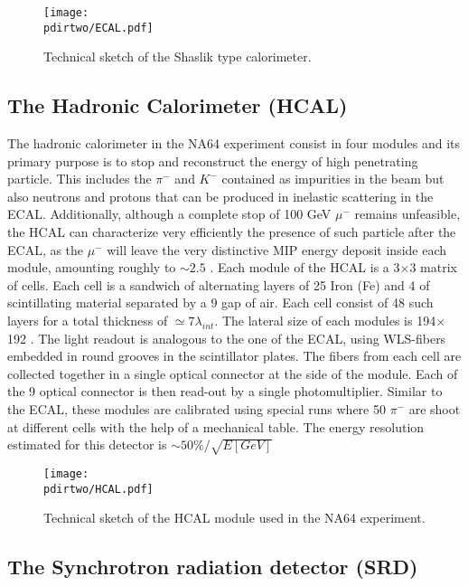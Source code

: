 \begin{figure}[bth!]
  \centering
  \texttt{[image: \\pdirtwo/ECAL.pdf]}
  \caption[ECAL sketch]{Technical sketch of the Shaslik type calorimeter.}
  \label{fig:ecal-sketch}
\end{figure}

\subsection{The Hadronic Calorimeter (HCAL)}
\label{ch2:sec:detectors-hcal}

The hadronic calorimeter in the NA64 experiment consist in four modules and its primary purpose is to stop and reconstruct the energy of high penetrating particle. This includes the $\pi^-$ and $K^-$ contained as impurities in the beam but also neutrons and protons that can be produced in inelastic scattering in the ECAL. Additionally, although a complete stop of 100 GeV $\mu^-$ remains unfeasible, the HCAL can characterize very efficiently the presence of such particle after the ECAL, as the $\mu^-$ will leave the very distinctive MIP energy deposit inside each module, amounting roughly to $\sim 2.5$ \gev. Each module of the HCAL is a 3$\times$3 matrix of cells. Each cell is a sandwich of alternating layers of 25 \mmi Iron (Fe) and 4 \mmi of scintillating material separated by a 9 \mmi gap  of air. Each cell consist of 48 such layers for a total thickness of $\simeq 7\lambda_{int}$. The lateral size of each modules is 194$\times$192 \mms. The light readout is analogous to the one of the ECAL, using WLS-fibers embedded in round grooves in the scintillator plates. The fibers from each cell are collected together in a single optical connector at the side of the module. Each of the 9 optical connector is then read-out by a single photomultiplier. Similar to the ECAL, these modules are calibrated using special runs where 50 \gev $\pi^-$ are shoot at different cells with the help of a mechanical table. The energy resolution estimated for this detector is $\sim 50\%/\sqrt{E[GeV]}$

\begin{figure}[bth!]
  \centering
  \texttt{[image: \\pdirtwo/HCAL.pdf]}
  \caption[HCAL sketch]{Technical sketch of the HCAL module used in the NA64 experiment.}
  \label{fig:hcal-sketch}
\end{figure}

\subsection{The Synchrotron radiation detector (SRD)}
\label{ch2:sec:detectors-srd}

